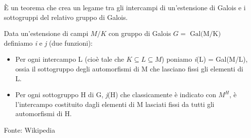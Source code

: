 \textsf{\small È un teorema che crea un legame tra gli intercampi di un'estensione di Galois e i sottogruppi del relativo gruppo di Galois.}

\textsf{\small Data un'estensione di campi $M/K$ con gruppo di Galois $G = \text{ Gal(M/K)}$ definiamo \emph{i} e \emph{j} (due funzioni): }

\begin{itemize}
	\item \textsf{\small Per ogni intercampo L (cioè tale che $K \subseteq L \subseteq M$) poniamo \emph{i}(L) = Gal(M/L), ossia il sottogruppo degli automorfismi di M che lasciano fissi gli elementi di L.}
	\item \textsf{\small Per ogni sottogruppo H di G, \emph{j}(H) che classicamente è indicato con $M^H$, è l'intercampo costituito dagli elementi di M lasciati fissi da tutti gli automorfismi di H.}
\end{itemize}

\textsf{\small Fonte: Wikipedia \cite{wikipediateoremafondamentaledigalois} } 

